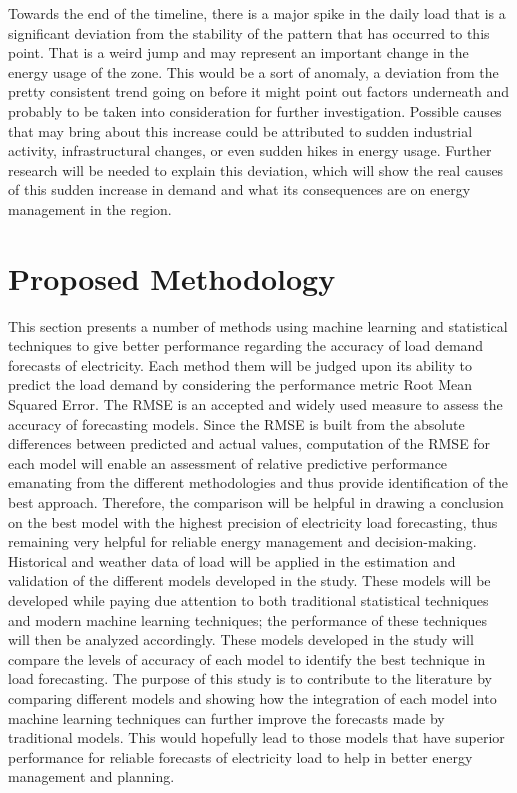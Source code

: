 \documentclass[12pt, a4paper,twoside]{report}
\theoremstyle{plain} %
\theoremstyle{definition} %
\theoremstyle{remark} %
\numberwithin{equation}{chapter}
\begin{document}
\newline
Towards the end of the timeline, there is a major spike in the daily load that is a significant deviation from the stability of the pattern that has occurred to this point. That is a weird jump and may represent an important change in the energy usage of the zone. This would be a sort of anomaly, a deviation from the pretty consistent trend going on before it might point out factors underneath and probably to be taken into consideration for further investigation. Possible causes that may bring about this increase could be attributed to sudden industrial activity, infrastructural changes, or even sudden hikes in energy usage. Further research will be needed to explain this deviation, which will show the real causes of this sudden increase in demand and what its consequences are on energy management in the region.

\chapter{Proposed Methodology}\label{ch:4}
This section presents a number of methods using machine learning and statistical techniques to give better performance regarding the accuracy of load demand forecasts of electricity. Each method them will be judged upon its ability to predict the load demand by considering the performance metric Root Mean Squared Error. The RMSE is an accepted and widely used measure to assess the accuracy of forecasting models. Since the RMSE is built from the absolute differences between predicted and actual values, computation of the RMSE for each model will enable an assessment of relative predictive performance emanating from the different methodologies and thus provide identification of the best approach. Therefore, the comparison will be helpful in drawing a conclusion on the best model with the highest precision of electricity load forecasting, thus remaining very helpful for reliable energy management and decision-making\cite{chai2014root}. Historical and weather data of load will be applied in the estimation and validation of the different models developed in the study. These models will be developed while paying due attention to both traditional statistical techniques and modern machine learning techniques; the performance of these techniques will then be analyzed accordingly. These models developed in the study will compare the levels of accuracy of each model to identify the best technique in load forecasting. The purpose of this study is to contribute to the literature by comparing different models and showing how the integration of each model into machine learning techniques can further improve the forecasts made by traditional models. This would hopefully lead to those models that have superior performance for reliable forecasts of electricity load to help in better energy management and planning.
\end{document}
